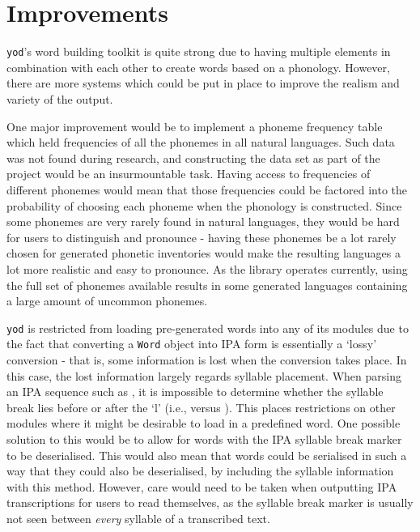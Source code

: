 \documentclass{report}
\begin{document}
	\section{Improvements}
	\label{section: improvements}
	
	\texttt{yod}'s word building toolkit is quite strong due to having multiple elements in combination with each other to create words based on a phonology. However, there are more systems which could be put in place to improve the realism and variety of the output.
	
	One major improvement would be to implement a phoneme frequency table which held frequencies of all the phonemes in all natural languages. Such data was not found during research, and constructing the data set as part of the project would be an insurmountable task. Having access to frequencies of different phonemes would mean that those frequencies could be factored into the probability of choosing each phoneme when the phonology is constructed. Since some phonemes are very rarely found in natural languages, they would be hard for users to distinguish and pronounce - having these phonemes be a lot rarely chosen for generated phonetic inventories would make the resulting languages a lot more realistic and easy to pronounce. As the library operates currently, using the full set of phonemes available results in some generated languages containing a large amount of uncommon phonemes.

	\texttt{yod} is restricted from loading pre-generated words into any of its modules due to the fact that converting a \texttt{Word} object into IPA form is essentially a `lossy' conversion - that is, some information is lost when the conversion takes place. In this case, the lost information largely regards syllable placement. When parsing an IPA sequence such as , it is impossible to determine whether the syllable break lies before or after the `l' (i.e.,  versus ). This places restrictions on other modules where it might be desirable to load in a predefined word. One possible solution to this would be to allow for words with the IPA syllable break marker to be deserialised. This would also mean that words could be serialised in such a way that they could also be deserialised, by including the syllable information with this method. However, care would need to be taken when outputting IPA transcriptions for users to read themselves, as the syllable break marker is usually not seen between \textit{every} syllable of a transcribed text.
	
\end{document}
